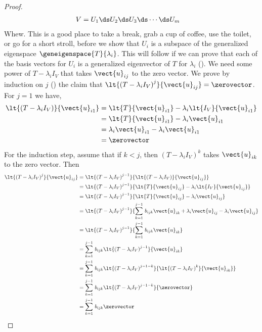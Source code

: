 \begin{proof}
%
\begin{align*}
V&=U_1\ds U_2\ds U_3\ds\cdots\ds U_m
\end{align*}
%
Whew.  This is a good place to take a break, grab a cup of coffee, use the toilet, or go for a short stroll, before we show that $U_i$ is a subspace of the generalized eigenspace $\geneigenspace{T}{\lambda_i}$.  This will follow if we can prove that each of the basis vectors for $U_i$ is a generalized eigenvector of $T$ for $\lambda_i$ ().  We need some power of $T-\lambda_i I_V$ that takes $\vect{u}_{ij}$ to the zero vector.  We prove by induction on $j$ () the claim that $\lt{\left(T-\lambda_i I_V\right)^j}{\vect{u}_{ij}}=\zerovector$.  For $j=1$ we have,
%
\begin{align*}
\lt{\left(T-\lambda_i I_V\right)}{\vect{u}_{i1}}
&=\lt{T}{\vect{u}_{i1}}-\lambda_i \lt{I_V}{\vect{u}_{i1}}\\
&=\lt{T}{\vect{u}_{i1}}-\lambda_i\vect{u}_{i1}\\
&=\lambda_i\vect{u}_{i1}-\lambda_i\vect{u}_{i1}\\
&=\zerovector
\end{align*}
%
For the induction step, assume that if $k<j$, then $\left(T-\lambda_i I_V\right)^k$ takes $\vect{u}_{ik}$ to the zero vector.  Then
%
\begin{align*}
\lt{\left(T-\lambda_i I_V\right)^j}{\vect{u}_{ij}}
&=
\lt{\left(T-\lambda_i I_V\right)^{j-1}}{\lt{\left(T-\lambda_i I_V\right)}{\vect{u}_{ij}}}\\
%
&=\lt{\left(T-\lambda_i I_V\right)^{j-1}}{
\lt{T}{\vect{u}_{ij}}-\lambda_i\lt{I_V}{\vect{u}_{ij}}
}\\
%
&=\lt{\left(T-\lambda_i I_V\right)^{j-1}}{
\lt{T}{\vect{u}_{ij}}-\lambda_i\vect{u}_{ij}
}\\
%
&=\lt{\left(T-\lambda_i I_V\right)^{j-1}}{
\sum_{k=1}^{j-1}\,b_{ijk}\vect{u}_{ik} + \lambda_i\vect{u}_{ij}-\lambda_i\vect{u}_{ij}
}\\
%
&=\lt{\left(T-\lambda_i I_V\right)^{j-1}}{
\sum_{k=1}^{j-1}\,b_{ijk}\vect{u}_{ik}
}\\
%
&=\sum_{k=1}^{j-1}\,b_{ijk}\lt{\left(T-\lambda_i I_V\right)^{j-1}}{\vect{u}_{ik}}\\
%
&=\sum_{k=1}^{j-1}\,b_{ijk}
\lt{\left(T-\lambda_i I_V\right)^{j-1-k}}{\lt{\left(T-\lambda_i I_V\right)^{k}}{\vect{u}_{ik}}}\\
%
&=\sum_{k=1}^{j-1}\,b_{ijk}\lt{\left(T-\lambda_i I_V\right)^{j-1-k}}{\zerovector}\\
%
&=\sum_{k=1}^{j-1}\,b_{ijk}\zerovector\\

\end{align*}
\end{proof}

